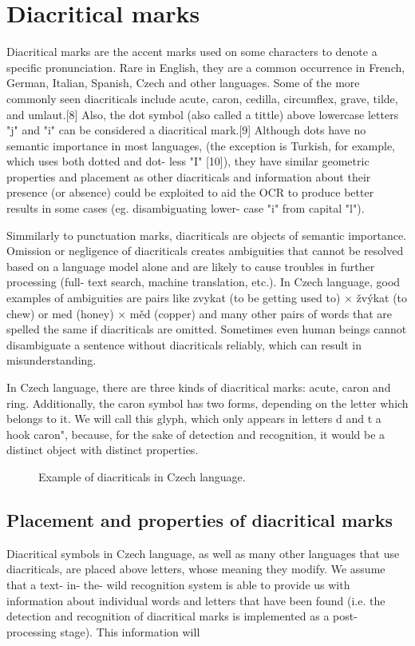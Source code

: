 \documentclass[12pt,a4paper]{report}
\begin{document}
\section{Diacritical marks}
Diacritical marks are the accent marks used on some characters to denote a specific pronunciation. Rare in English, they are a common occurrence in French, German, Italian, Spanish, Czech and other languages. Some of the more commonly seen diacriticals include acute, caron, cedilla, circumflex, grave, tilde, and umlaut.[8] Also, the dot symbol (also called a tittle) above lowercase letters "j" and "i" can be considered a diacritical mark.[9] Although dots have no semantic importance in most languages, (the exception is Turkish, for example, which uses both dotted and dot- less "I" [10]), they have similar geometric properties and placement as other diacriticals and information about their presence (or absence) could be exploited to aid the OCR to produce better results in some cases (eg. disambiguating lower- case "i" from capital "l").

Simmilarly to punctuation marks, diacriticals are objects of semantic importance. Omission or negligence of diacriticals creates ambiguities that cannot be resolved based on a language model alone and are likely to cause troubles in further processing (full- text search, machine translation, etc.). In Czech language, good examples of ambiguities are pairs like zvykat (to be getting used to) × žvýkat (to chew) or med (honey) × měd (copper) and many other pairs of words that are spelled the same if diacriticals are omitted. Sometimes even human beings cannot disambiguate a sentence without diacriticals reliably, which can result in misunderstanding.

In Czech language, there are three kinds of diacritical marks: acute, caron and ring. Additionally, the caron symbol has two forms, depending on the letter which belongs to it. We will call this glyph, which only appears in letters d and t a hook caron", because, for the sake of detection and recognition, it would be a distinct object with distinct properties.

\begin{figure}[htbp]
    \centering
    \caption{Example of diacriticals in Czech language.}
    \label{fig:diacriticals}
\end{figure}

\subsection{Placement and properties of diacritical marks}
Diacritical symbols in Czech language, as well as many other languages that use diacriticals, are placed above letters, whose meaning they modify. We assume that a text- in- the- wild recognition system is able to provide us with information about individual words and letters that have been found (i.e. the detection and recognition of diacritical marks is implemented as a post- processing stage). This information will
\end{document}
